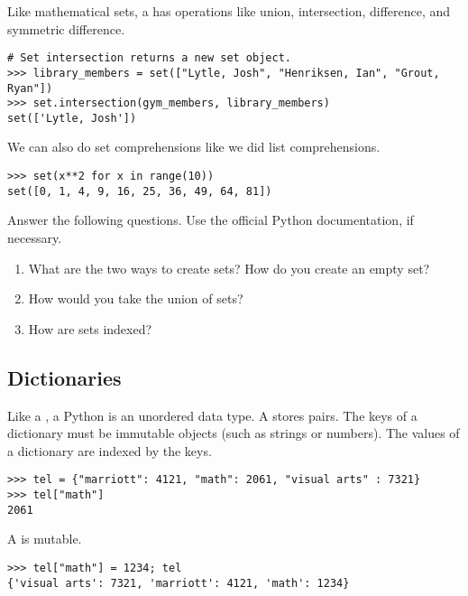 Like mathematical sets, a  has operations like union, intersection, 
difference, and symmetric difference.

\begin{lstlisting}
# Set intersection returns a new set object.
>>> library_members = set(["Lytle, Josh", "Henriksen, Ian", "Grout, Ryan"])
>>> set.intersection(gym_members, library_members)
set(['Lytle, Josh'])
\end{lstlisting}

We can also do set comprehensions like we did list comprehensions.
\begin{lstlisting}
>>> set(x**2 for x in range(10))
set([0, 1, 4, 9, 16, 25, 36, 49, 64, 81])
\end{lstlisting}

\begin{problem}
Answer the following questions. Use the official Python documentation, if necessary.
\begin{enumerate}
\item What are the two ways to create sets? How do you create an empty set?
\item How would you take the union of sets?
\item How are sets indexed?
\end{enumerate}
\end{problem}

\subsection*{Dictionaries}
Like a , a Python  is an unordered data type.  A  stores  pairs. The keys of a dictionary must be immutable objects (such as strings or numbers). The values of a dictionary are indexed by the keys.
\begin{lstlisting}
>>> tel = {"marriott": 4121, "math": 2061, "visual arts" : 7321} 
>>> tel["math"]
2061
\end{lstlisting}
A  is mutable.
\begin{lstlisting}
>>> tel["math"] = 1234; tel
{'visual arts': 7321, 'marriott': 4121, 'math': 1234}
\end{lstlisting}

